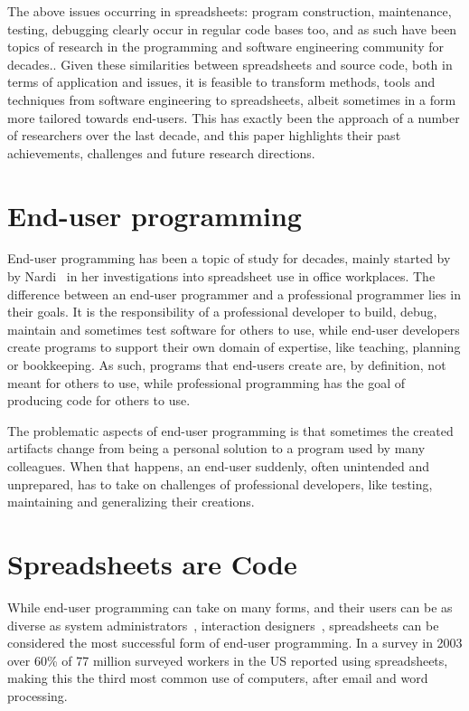 \documentclass[conference]{IEEEtran}
\begin{document}
The above issues occurring in spreadsheets: program construction, maintenance, testing, debugging clearly occur in regular code bases too, and as such have been topics of research in the programming and software engineering community for decades.. Given these similarities between spreadsheets and source code, both in terms of application and issues, it is feasible to transform methods, tools and techniques from software engineering to spreadsheets, albeit sometimes in a form more tailored towards end-users. This has exactly been the approach of a number of researchers over the last decade, and this paper highlights their past achievements, challenges and future research directions. 


\section{End-user programming}
End-user programming has been a topic of study for decades, mainly started by by Nardi~\cite{Nardi1993} in her investigations into spreadsheet use in office workplaces. The difference between an end-user programmer and a professional programmer lies in their goals. It is the responsibility of a professional developer to build, debug, maintain and sometimes test software for others to use, while end-user developers create programs to support their own domain of expertise, like teaching, planning or bookkeeping.  As such, programs that end-users create are, by definition, not meant for others to use, while professional programming has the goal of producing code for others to use. 

The problematic aspects of end-user programming is that sometimes the created artifacts change from being a personal solution to a program used by many colleagues. When that happens, an end-user suddenly, often unintended and unprepared, has to take on challenges of professional developers, like testing, maintaining and generalizing their creations.

\section{Spreadsheets are Code}
While end-user programming can take on many forms, and their users can be as diverse as system administrators~\cite{Barrett2004}, interaction designers~\cite{Ko2004, brandt_opportunistic_2008, myers_how_2008}, spreadsheets can be considered the most successful form of end-user programming. In a survey  in 2003 over 60\% of 77 million surveyed workers in the US reported using spreadsheets, making this the third most common use of computers, after email and word processing. 
\end{document}
